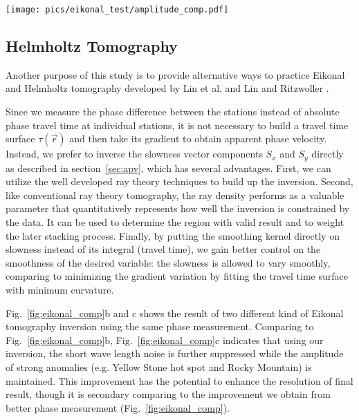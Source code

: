 \documentclass{gji}
\begin{document}
\begin{figure*}
	\texttt{[image: pics/eikonal\_test/amplitude\_comp.pdf]}
	\caption{}
	\label{fig:amp_comp}
\end{figure*}

\subsection{Helmholtz Tomography}

Another purpose of this study is to provide alternative ways to practice Eikonal and Helmholtz tomography developed by Lin et al.  and Lin and Ritzwoller . 

Since we measure the phase difference between the stations instead of absolute phase travel time at individual stations, it is not necessary to build a travel time surface $\tau(\vec{r})$ and then take its gradient to obtain apparent phase velocity. Instead, we prefer to inverse the slowness vector components $S_x$ and $S_y$ directly as described in section~\ref{sec:apv}, which has several advantages. First, we can utilize the  well developed ray theory techniques to build up the inversion. Second, like conventional ray theory tomography, the ray density performs as a valuable parameter that quantitatively represents how well the inversion is constrained by the data. It can be used to determine the region with valid result and to weight the later stacking process. Finally, by putting the smoothing kernel directly on slowness instead of its integral (travel time), we gain better control on the smoothness of the desired variable: the slowness is allowed to vary smoothly, comparing to minimizing the gradient variation by fitting the travel time surface with minimum curvature. 

Fig.~\ref{fig:eikonal_comp}b and c shows the result of two different kind of Eikonal tomography inversion using the same phase measurement. Comparing to Fig.~\ref{fig:eikonal_comp}b, Fig.~\ref{fig:eikonal_comp}c indicates that using our inversion, the short wave length noise is further suppressed while the amplitude of strong anomalies (e.g. Yellow Stone hot spot and Rocky Mountain) is maintained. This improvement has the potential to enhance the resolution of final result, though it is secondary comparing to the improvement we obtain from better phase measurement (Fig.~\ref{fig:eikonal_comp}). 
\end{document}
